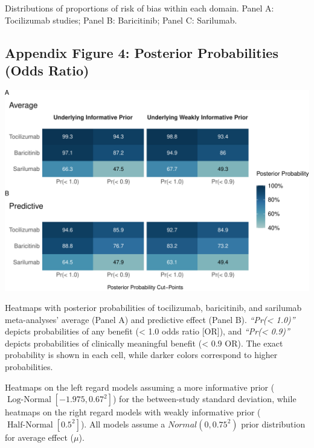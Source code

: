 \documentclass[
  12pt,
]{article}
\begin{document}
Distributions of proportions of risk of bias within each domain. Panel
A: Tocilizumab studies; Panel B: Baricitinib; Panel C: Sarilumab.

\newpage

\hypertarget{appendix-figure-4-posterior-probabilities-odds-ratio}{%
\subsection{Appendix Figure 4: Posterior Probabilities (Odds
Ratio)}\label{appendix-figure-4-posterior-probabilities-odds-ratio}}

\begin{center}\includegraphics{supplementary_material_files/figure-latex/posterior probabilities heatmap-1} \end{center}

Heatmaps with posterior probabilities of tocilizumab, baricitinib, and
sarilumab meta-analyses' average (Panel A) and predictive effect (Panel
B). \emph{``Pr(\textless{} 1.0)''} depicts probabilities of any benefit
(\textless{} 1.0 odds ratio {[}OR{]}), and \emph{``Pr(\textless{}
0.9)''} depicts probabilities of clinically meaningful benefit
(\textless{} 0.9 OR). The exact probability is shown in each cell, while
darker colors correspond to higher probabilities.

Heatmaps on the left regard models assuming a more informative prior
(\(\operatorname{Log-Normal}[-1.975, 0.67^2]\)) for the between-study
standard deviation, while heatmaps on the right regard models with
weakly informative prior (\(\operatorname{Half-Normal}[0.5^2]\)). All
models assume a \(Normal(0, 0.75^2)\) prior distribution for average
effect (\(\mu\)).
\end{document}
